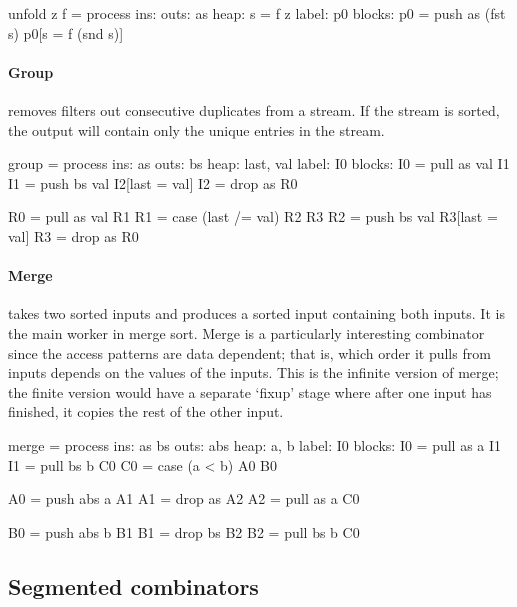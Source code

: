 \begin{code}
unfold z f = process
     ins: 
    outs: as
    heap: {s = f z}
   label: p0
  blocks: p0 = push as (fst s) p0[s = f (snd s)]
\end{code}

\paragraph{Group} removes filters out consecutive duplicates from a stream.
If the stream is sorted, the output will contain only the unique entries in the stream.

\begin{code}
group = process
     ins: as
    outs: bs
    heap: {last, val}
   label: I0
  blocks: I0 = pull as val I1
          I1 = push bs val I2[last = val]
          I2 = drop as     R0

          R0 = pull as val R1
          R1 = case (last /= val) R2 R3
          R2 = push bs val R3[last = val]
          R3 = drop as     R0
\end{code}

\paragraph{Merge} takes two sorted inputs and produces a sorted input containing both inputs.
It is the main worker in merge sort.
Merge is a particularly interesting combinator since the access patterns are data dependent; that is, which order it pulls from inputs depends on the values of the inputs.
This is the infinite version of merge; the finite version would have a separate `fixup' stage where after one input has finished, it copies the rest of the other input.

\begin{code}
merge = process
     ins: as bs
    outs: abs
    heap: {a, b}
   label: I0
  blocks: I0 = pull as a  I1
          I1 = pull bs b  C0
          C0 = case (a < b) A0 B0

          A0 = push abs a A1
          A1 = drop as    A2
          A2 = pull as  a C0

          B0 = push abs b B1
          B1 = drop bs    B2
          B2 = pull bs  b C0
\end{code}

\subsection{Segmented combinators}

